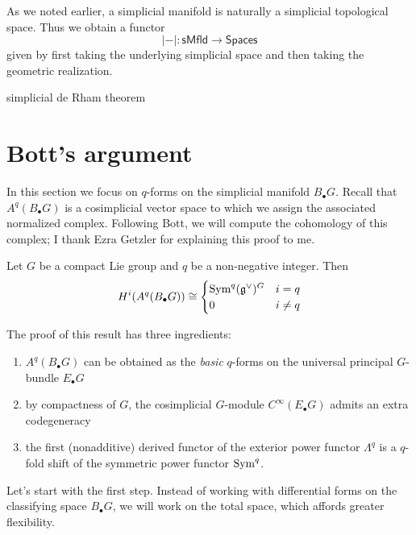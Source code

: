 \documentclass{amsart}
\begin{document}
As we noted earlier, a simplicial manifold is naturally a simplicial topological 
space. Thus we obtain a functor
\begin{equation*}
    |-| : \mathsf{sMfld} \to \mathsf{Spaces}
\end{equation*}
given by first taking the underlying simplicial space and then taking the 
geometric realization.

simplicial de Rham theorem 

\section{Bott's argument}

In this section we focus on $q$-forms on the simplicial manifold $B_\bullet G$.
Recall that $A^q(B_\bullet G)$ is a cosimplicial vector space to which we
assign the associated normalized complex. Following Bott, we will compute the 
cohomology of this complex; I thank Ezra Getzler for explaining this proof
to me.

\begin{theorem}[Bott '73]
    Let $G$ be a compact Lie group and $q$ be a non-negative integer.
    Then
    \begin{equation*}
        H^i(A^q(B_\bullet G)) \cong
        \begin{cases}
            \operatorname{Sym}^q(\mathfrak g^\vee)^G & i=q \\
            0 & i\neq q
        \end{cases}
    \end{equation*}
\end{theorem}

The proof of this result has three ingredients:
\begin{enumerate}
    \item $A^q(B_\bullet G)$ can be obtained as the \textit{basic} 
        $q$-forms on the universal principal $G$-bundle $E_\bullet G$
    \item by compactness of $G$, the cosimplicial $G$-module $C^\infty(E_\bullet 
        G)$ admits an extra codegeneracy  
    \item the first (nonadditive) derived functor of the
        exterior power functor $\Lambda^q$ is a $q$-fold shift of the symmetric
        power functor $\operatorname{Sym}^q$.
\end{enumerate}

Let's start with the first step. Instead of working with differential forms on 
the classifying space $B_\bullet G$, we will work on the total space, which 
affords greater flexibility.
\end{document}
